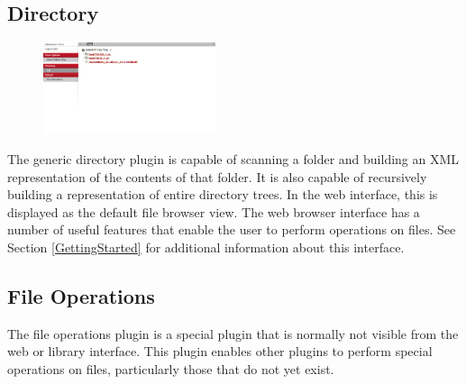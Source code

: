 \documentclass[10pt]{article}
\begin{document}
\endgroup


\clearpage
\begingroup
\setlength\intextsep{0pt}
\subsection{Directory}
\begin{figure}
		\includegraphics[width=0.45\textwidth]{Directory.png}
\end{figure}
The generic directory plugin is capable of scanning a folder and building an XML representation of the contents of that folder.  It is also capable of recursively building a representation of entire directory trees.  In the web interface, this is displayed as the default file browser view.  The web browser interface has a number of useful features that enable the user to perform operations on files.  See Section \ref{GettingStarted} for additional information about this interface.

\endgroup



\begin{changemargin}{0in}{220.6pt}
\subsection{File Operations}
The file operations plugin is a special plugin that is normally not visible from the web or library interface.  This plugin enables other plugins to perform special operations on files, particularly those that do not yet exist.
\end{changemargin}



\begingroup
\setlength\intextsep{0pt}
\end{document}
